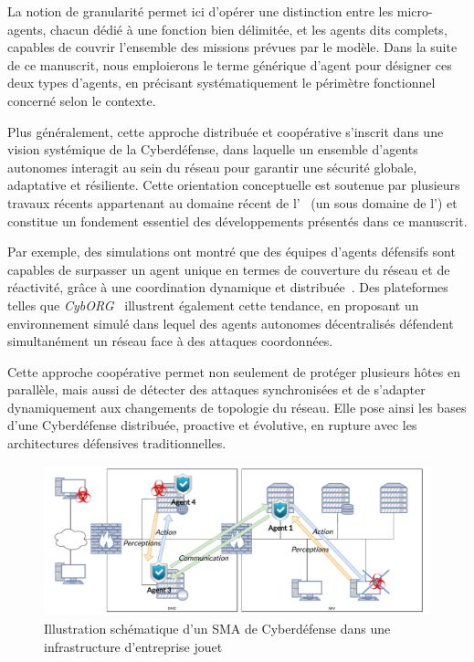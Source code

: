 La notion de granularité permet ici d'opérer une distinction entre les micro-agents, chacun dédié à une fonction bien délimitée, et les agents  dits complets, capables de couvrir l'ensemble des missions prévues par le modèle. Dans la suite de ce manuscrit, nous emploierons le terme générique d'agent  pour désigner ces deux types d'agents, en précisant systématiquement le périmètre fonctionnel concerné selon le contexte.

Plus généralement, cette approche distribuée et coopérative s'inscrit dans une vision systémique de la Cyberdéfense, dans laquelle un ensemble d'agents autonomes interagit au sein du réseau pour garantir une sécurité globale, adaptative et résiliente. Cette orientation conceptuelle est soutenue par plusieurs travaux récents appartenant au domaine récent de l'~\cite{Vyas2023} (un sous domaine de l') et constitue un fondement essentiel des développements présentés dans ce manuscrit.


Par exemple, des simulations ont montré que des équipes d'agents défensifs sont capables de surpasser un agent unique en termes de couverture du réseau et de réactivité, grâce à une coordination dynamique et distribuée~\cite{RLResilientCyberdefense2024}.
Des plateformes telles que \textit{CybORG}~\cite{cage_challenge_3_announcement} illustrent également cette tendance, en proposant un environnement simulé dans lequel des agents autonomes décentralisés défendent simultanément un réseau face à des attaques coordonnées.

Cette approche coopérative permet non seulement de protéger plusieurs hôtes en parallèle, mais aussi de détecter des attaques synchronisées et de s'adapter dynamiquement aux changements de topologie du réseau. Elle pose ainsi les bases d'une Cyberdéfense distribuée, proactive et évolutive, en rupture avec les architectures défensives traditionnelles.


\begin{figure}[h]
    \centering
    \includegraphics[width=\linewidth]{figures/infra_MAS_illustration.pdf}
    \caption{Illustration schématique d'un SMA de Cyberdéfense dans une infrastructure d'entreprise jouet}
    \label{fig:distributed_sma}
\end{figure}

